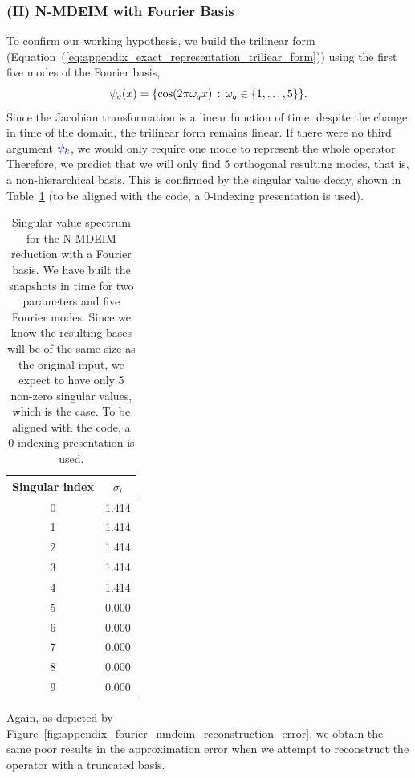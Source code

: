 \documentclass[../../thesis.tex]{subfiles}
\begin{document}
\subsubsection{(II) N-MDEIM with Fourier Basis}
To confirm our working hypothesis, 
we build the trilinear form 
(Equation~(\ref{eq:appendix_exact_representation_triliear_form}))
using the first five modes of the Fourier basis,
\begin{equation}
    \psi_q(x) = \qty{\cos(2 \pi \omega_q x) \, : \, \omega_q \in \qty{1, \ldots, 5}}.
\end{equation}
Since the Jacobian transformation is a linear function of time, 
despite the change in time of the domain, the trilinear form remains linear.
If there were no third argument 
$\textcolor{blue}{\psi_k}$, 
we would only require one mode to represent the whole operator.
Therefore, we predict that we will only find 5 orthogonal resulting modes, that is, a non-hierarchical basis. 
This is confirmed by the singular value decay, 
shown in Table~\ref{tab:ndeim_with_fourier_modes}
(to be aligned with the code, a 0-indexing presentation is used).

\begin{table}[h]
    \centering
    \caption{Singular value spectrum for the N-MDEIM reduction with a Fourier basis.
    We have built the snapshots in time for two parameters and five Fourier modes.
    Since we know the resulting bases will be of the same size as the original input,
    we expect to have only 5 non-zero singular values, which is the case.
    To be aligned with the code, a 0-indexing presentation is used.}
    \begin{tabular}{cc}
        \toprule
        Singular index & $\sigma_i$ \\
        \midrule
        0 &  1.414 \\
        1 &  1.414 \\
        2 &  1.414 \\
        3 &  1.414 \\
        4 &  1.414 \\
        5 &  0.000 \\
        6 &  0.000 \\
        7 &  0.000 \\
        8 &  0.000 \\
        9 &  0.000 \\
        \bottomrule
    \end{tabular}
    \label{tab:ndeim_with_fourier_modes}
\end{table}
Again, as depicted by Figure~\ref{fig:appendix_fourier_nmdeim_reconstruction_error},
we obtain the same poor results in the approximation error when
we attempt to reconstruct the operator with a truncated basis. 
\end{document}
